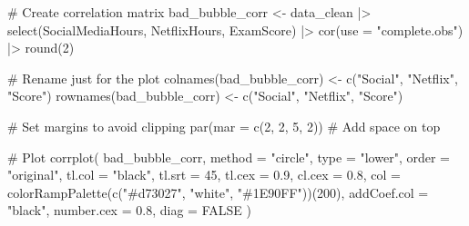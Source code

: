 \documentclass[
  11pt,
  letterpaper,
  DIV=11,
  numbers=noendperiod]{scrartcl}
\newenvironment{Shaded}{\begin{snugshade}}{\end{snugshade}}
\newcommand{\AttributeTok}[1]{\textcolor[rgb]{0.40,0.45,0.13}{#1}}
\newcommand{\CommentTok}[1]{\textcolor[rgb]{0.37,0.37,0.37}{#1}}
\newcommand{\ConstantTok}[1]{\textcolor[rgb]{0.56,0.35,0.01}{#1}}
\newcommand{\DecValTok}[1]{\textcolor[rgb]{0.68,0.00,0.00}{#1}}
\newcommand{\FloatTok}[1]{\textcolor[rgb]{0.68,0.00,0.00}{#1}}
\newcommand{\FunctionTok}[1]{\textcolor[rgb]{0.28,0.35,0.67}{#1}}
\newcommand{\NormalTok}[1]{\textcolor[rgb]{0.00,0.23,0.31}{#1}}
\newcommand{\OtherTok}[1]{\textcolor[rgb]{0.00,0.23,0.31}{#1}}
\newcommand{\SpecialCharTok}[1]{\textcolor[rgb]{0.37,0.37,0.37}{#1}}
\newcommand{\StringTok}[1]{\textcolor[rgb]{0.13,0.47,0.30}{#1}}
\begin{document}
\begin{Shaded}
\begin{Highlighting}[]
\CommentTok{\# Create correlation matrix}
\NormalTok{bad\_bubble\_corr }\OtherTok{\textless{}{-}}\NormalTok{ data\_clean }\SpecialCharTok{|\textgreater{}}
  \FunctionTok{select}\NormalTok{(SocialMediaHours, NetflixHours, ExamScore) }\SpecialCharTok{|\textgreater{}}
  \FunctionTok{cor}\NormalTok{(}\AttributeTok{use =} \StringTok{"complete.obs"}\NormalTok{) }\SpecialCharTok{|\textgreater{}}
  \FunctionTok{round}\NormalTok{(}\DecValTok{2}\NormalTok{)}

\CommentTok{\# Rename just for the plot}
\FunctionTok{colnames}\NormalTok{(bad\_bubble\_corr) }\OtherTok{\textless{}{-}} \FunctionTok{c}\NormalTok{(}\StringTok{"Social"}\NormalTok{, }\StringTok{"Netflix"}\NormalTok{, }\StringTok{"Score"}\NormalTok{)}
\FunctionTok{rownames}\NormalTok{(bad\_bubble\_corr) }\OtherTok{\textless{}{-}} \FunctionTok{c}\NormalTok{(}\StringTok{"Social"}\NormalTok{, }\StringTok{"Netflix"}\NormalTok{, }\StringTok{"Score"}\NormalTok{)}

\CommentTok{\# Set margins to avoid clipping}
\FunctionTok{par}\NormalTok{(}\AttributeTok{mar =} \FunctionTok{c}\NormalTok{(}\DecValTok{2}\NormalTok{, }\DecValTok{2}\NormalTok{, }\DecValTok{5}\NormalTok{, }\DecValTok{2}\NormalTok{))  }\CommentTok{\# Add space on top}

\CommentTok{\# Plot}
\FunctionTok{corrplot}\NormalTok{(}
\NormalTok{  bad\_bubble\_corr,}
  \AttributeTok{method =} \StringTok{"circle"}\NormalTok{,}
  \AttributeTok{type =} \StringTok{"lower"}\NormalTok{,}
  \AttributeTok{order =} \StringTok{"original"}\NormalTok{,}
  \AttributeTok{tl.col =} \StringTok{"black"}\NormalTok{,}
  \AttributeTok{tl.srt =} \DecValTok{45}\NormalTok{,}
  \AttributeTok{tl.cex =} \FloatTok{0.9}\NormalTok{,}
  \AttributeTok{cl.cex =} \FloatTok{0.8}\NormalTok{,}
  \AttributeTok{col =} \FunctionTok{colorRampPalette}\NormalTok{(}\FunctionTok{c}\NormalTok{(}\StringTok{"\#d73027"}\NormalTok{, }\StringTok{"white"}\NormalTok{, }\StringTok{"\#1E90FF"}\NormalTok{))(}\DecValTok{200}\NormalTok{),}
  \AttributeTok{addCoef.col =} \StringTok{"black"}\NormalTok{,}
  \AttributeTok{number.cex =} \FloatTok{0.8}\NormalTok{,}
  \AttributeTok{diag =} \ConstantTok{FALSE}
\NormalTok{)}
\end{Highlighting}
\end{Shaded}
\end{document}
